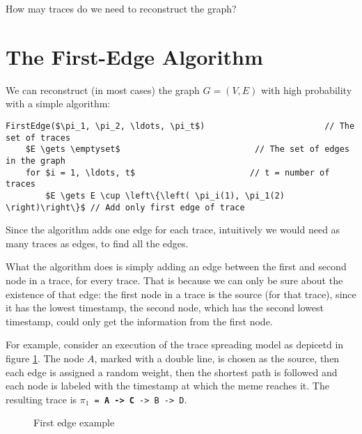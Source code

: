 \begin{qst}
    How may traces do we need to reconstruct the graph?
\end{qst}

\section{The First-Edge Algorithm}
We can reconstruct (in most cases) the graph $G=(V, E)$ with high probability with a simple algorithm:
 
\begin{lstlisting}[caption={The first-edge algorithm},label={lst:first-edge}]
FirstEdge($\pi_1, \pi_2, \ldots, \pi_t$)                        // The set of traces
	$E \gets \emptyset$                           // The set of edges in the graph
	for $i = 1, \ldots, t$                       // t = number of traces
		$E \gets E \cup \left\{\left( \pi_i(1), \pi_1(2) \right)\right\}$ // Add only first edge of trace
\end{lstlisting}

Since the algorithm adds one edge for each trace, intuitively we would need as many traces as edges, to find all the edges.

What the algorithm does is simply adding an edge between the first and second node in a trace, for every trace. That is because we can only be sure about the existence of that edge: the first node in a trace is the source (for that trace), since it has the lowest timestamp, the second node, which has the second lowest timestamp, could only get the information from the first node.

For example, consider an execution of the trace spreading model as depicetd in figure \ref{fig:first-edge-ex}. The node $A$, marked with a double line, is chosen as the source, then each edge is assigned a random weight, then the shortest path is followed and each node is labeled with the timestamp at which the meme reaches it. The resulting trace is \texttt{$\pi_1$ = \textbf{A -> C} -> B -> D}.

\begin{figure}[ht]
    \centering
    \caption{First edge example}
    \label{fig:first-edge-ex}
\end{figure}

